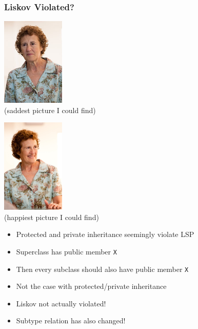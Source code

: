 \begin{frame}
  \frametitle{Liskov Violated?}
  \begin{overprint}
    \begin{center}
      \includegraphics[width=3cm]{sad-liskov.jpg} \\
      \tiny (saddest picture I could find)
    \end{center}
    \begin{center}
      \includegraphics[width=3cm]{happy-liskov.jpg} \\
      \tiny (happiest picture I could find)
    \end{center}
  \end{overprint}
  \vskip5mm
  \begin{overprint}
    \begin{itemize}
      \item Protected and private inheritance seemingly violate LSP
      \item Superclass has public member {\tt X}
      \item Then every subclass should also have public member {\tt X}
      \item Not the case with protected/private inheritance
    \end{itemize}

    \begin{itemize}
      \item Liskov not actually violated!
      \item Subtype relation has also changed!
    \end{itemize}
  \end{overprint}
\end{frame}

